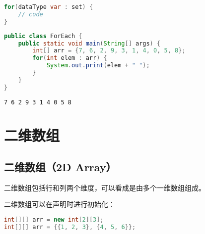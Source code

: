 \vspace{-0.5cm}

\begin{lstlisting}[language=Java]
for(dataType var : set) {
    // code
}
\end{lstlisting}

\vspace{0.5cm}


\begin{lstlisting}[language=Java]
public class ForEach {
    public static void main(String[] args) {
        int[] arr = {7, 6, 2, 9, 3, 1, 4, 0, 5, 8};
        for(int elem : arr) {
            System.out.print(elem + " ");
        }
    }
}
\end{lstlisting}

\begin{tcolorbox}
	\begin{verbatim}
7 6 2 9 3 1 4 0 5 8
	\end{verbatim}
\end{tcolorbox}

\newpage

\section{二维数组}

\subsection{二维数组（2D Array）}

二维数组包括行和列两个维度，可以看成是由多个一维数组组成。

\begin{table}[H]
	\centering
\end{table}

二维数组可以在声明时进行初始化：

\vspace{-0.5cm}

\begin{lstlisting}[language=Java]
int[][] arr = new int[2][3];
int[][] arr = {{1, 2, 3}, {4, 5, 6}};
\end{lstlisting}

